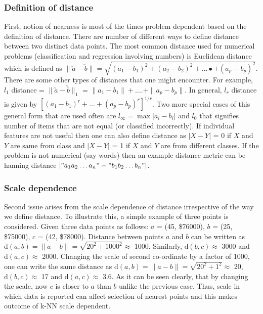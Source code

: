 \documentclass{article}
\begin{document}
\subsubsection{Definition of distance}
First, notion of nearness is most of the times problem dependent based on the definition of distance. There are number of different ways to define distance between two distinct data points. The most common distance used for numerical problems (classification and regression involving numbers) is Euclidean distance which is defined as $\| \utilde{a} - \utilde{b}\| = \sqrt{(a_1 - b_1)^2 + (a_2 - b_2)^2 +\dots{•}+ (a_p - b_p)^2}$. There are some other types of distances that one might encounter. For example, $l_1$ distance = $\| \utilde{a} - \utilde{b} \|_1$ = $\|a_1 - b_1\| + \dots{.} + \|a_p - b_p\|$. In general, $l_r$ distance is given by $[(a_1 - b_1)^r + \dots{} + (a_p - b_p)^r]^{1/r}$. Two more special cases of this general form that are used often are $l_{\infty} = \max{|a_i - b_i|}$ and $l_0$ that signifies number of items that are not equal (or classified incorrectly). If individual features are not useful then one can also define distance as $|X - Y|$ = 0 if $X$ and $Y$ are same from class and $|X - Y|$ = 1 if $X$ and $Y$ are from different classes. If the problem is not numerical (say words) then an example distance metric can be hanning distance $|"a_1a_2\dots{}a_n" - "b_1b_2\dots{}b_n"|$.

\subsubsection{Scale dependence}
Second issue arises from the scale dependence of distance irrespective of the way we define distance. To illustrate this, a simple example of three points is considered. Given three data points as follows:
$a$ = (45, \$76000), $b$ = (25, \$75000), $c$ = (42, \$78000). Distance between points $a$ and $b$ can be written as $\mathrm{d}(a, b) = \|a - b\| = \sqrt{\mathrm{20^2} + \mathrm{1000^2}} \approx$ 1000. Similarly, $\mathrm{d}(b,c) \approx$ 3000 and $\mathrm{d}(a,c) \approx$ 2000. Changing the scale of second co-ordinate by a factor of 1000, one can write the same distance as $\mathrm{d}(a, b) = \|a - b\| = \sqrt{\mathrm{20}^2 + \mathrm{1}^2} \approx$ 20, $\mathrm{d}(b,c) \approx$ 17 and $\mathrm{d}(a, c) \approx$ 3.6. As it can be seen clearly, that by changing the scale, now $c$ is closer to $a$ than $b$ unlike the previous case. Thus, scale in which data is reported can affect selection of nearest points and this makes outcome of k-NN scale dependent. 
\end{document}
